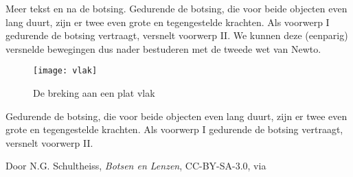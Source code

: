 Meer tekst en na de botsing. Gedurende de botsing, die voor beide
objecten even lang duurt, zijn er twee even grote en tegengestelde
krachten. Als voorwerp I gedurende de botsing vertraagt, versnelt
voorwerp II. We kunnen deze (eenparig) versnelde bewegingen dus nader
bestuderen met de tweede wet van Newto.

\begin{figure}[H]
    \centering
    \texttt{[image: vlak]}
    \caption{De breking aan een plat vlak}\label{fig:vlak}
\end{figure}

Gedurende de botsing, die voor beide objecten even lang duurt, zijn er
twee even grote en tegengestelde krachten. Als voorwerp I gedurende de
botsing vertraagt, versnelt voorwerp II.

\begin{thebibliography}{9}
        Door N.G. Schultheiss, \emph{Botsen en Lenzen}, CC-BY-SA-3.0, via \hisparc
\end{thebibliography}


